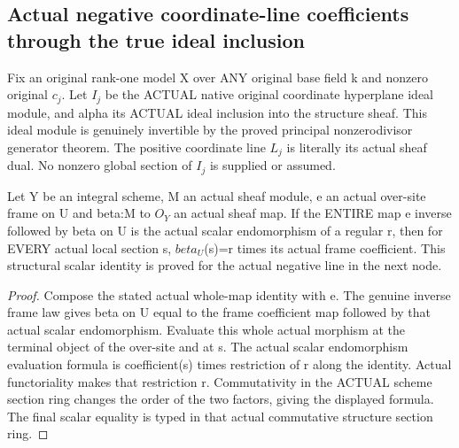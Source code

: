 \subsection{Actual negative coordinate-line coefficients through the true ideal inclusion}
Fix an original rank-one model X over ANY original base field k and
nonzero original $c_j$. Let $I_j$ be the ACTUAL native original coordinate
hyperplane ideal module, and alpha its ACTUAL ideal inclusion into the
structure sheaf. This ideal module is genuinely invertible by the proved
principal nonzerodivisor generator theorem. The positive coordinate line
$L_j$ is literally its actual sheaf dual. No nonzero global section of $I_j$
is supplied or assumed.

\begin{lemma}
\label{lem:seven-native-map-to-unit-frame-coefficient}
\leanok
Let Y be an integral scheme, M an actual sheaf module, e an actual
over-site frame on U and beta:M to $O_Y$ an actual sheaf map. If the ENTIRE
map e inverse followed by beta on U is the actual scalar endomorphism
of a regular r, then for EVERY actual local section s,
$beta_U$(s)=r times its actual frame coefficient. This structural scalar
identity is proved for the actual negative line in the next node.
\end{lemma}
\begin{proof}
Compose the stated actual whole-map identity with e. The genuine inverse
frame law gives beta on U equal to the frame coefficient map followed
by that actual scalar endomorphism. Evaluate this whole actual morphism
at the terminal object of the over-site and at s. The actual scalar
endomorphism evaluation formula is coefficient(s) times restriction of r
along the identity. Actual functoriality makes that restriction r.
Commutativity in the ACTUAL scheme section ring changes the order of
the two factors, giving the displayed formula. The final scalar equality
is typed in that actual commutative structure section ring.
\end{proof}

